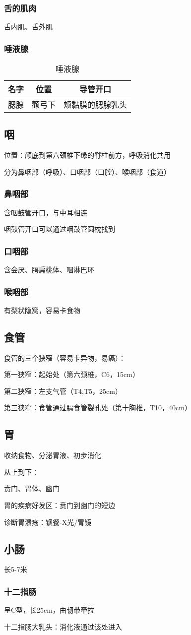 \subsubsection*{舌的肌肉}%
\label{subsub:舌的肌肉}
舌内肌、舌外肌
\subsubsection{唾液腺}%
\label{subsub:唾液腺}
\begin{table}[htpb]
    \centering
    \caption{唾液腺}
    \label{tab:唾液腺}
    \begin{tabular}{ccc}
    \toprule
    名字 & 位置 & 导管开口\\
    \midrule
    腮腺 & 颧弓下 & 颊黏膜的腮腺乳头\\
    \bottomrule
    \end{tabular}
\end{table}
\subsection{咽}%
\label{sub:咽}
位置：颅底到第六颈椎下缘的脊柱前方，呼吸消化共用

分为鼻咽部（呼吸）、口咽部（口腔）、喉咽部（食道）
\subsubsection{鼻咽部}%
\label{subsub:鼻咽部}
含咽鼓管开口，与中耳相连

咽鼓管开口可以通过咽鼓管圆枕找到
\subsubsection{口咽部}%
\label{subsub:口咽部}
含会厌、腭扁桃体、咽淋巴环
\subsubsection{喉咽部}%
\label{subsub:喉咽部}
有梨状隐窝，容易卡食物
\subsection{食管}%
\label{sub:食管}
食管的三个狭窄（容易卡异物，易癌）：

第一狭窄：起始处（第六颈椎，C6，15cm）

第二狭窄：左支气管（T4,T5，25cm）

第三狭窄：食管通过膈食管裂孔处（第十胸椎，T10，40cm）
\subsection{胃}%
\label{sub:胃}
收纳食物、分泌胃液、初步消化
\begin{notation}
    从上到下：

    贲门、胃体、幽门

    胃的疾病好发区：贲门到幽门的短边

    诊断胃溃疡：钡餐-X光/胃镜
\end{notation}
\subsection{小肠}%
\label{sub:小肠}
长5-7米
\subsubsection{十二指肠}%
\label{subsub:十二指肠}
呈C型，长25cm，由韧带牵拉
\begin{notation}
    十二指肠大乳头：消化液通过该处进入
\end{notation}

